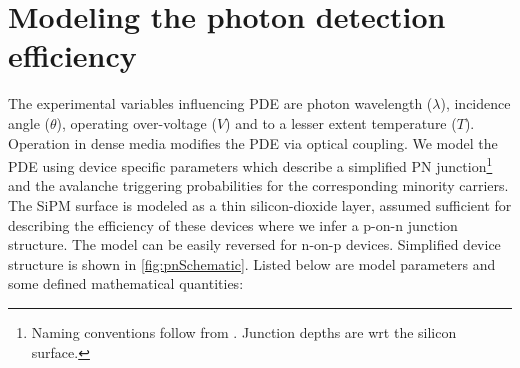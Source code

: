  
\section{Modeling the photon detection efficiency}

The experimental variables influencing PDE are photon wavelength ($\lambda$), incidence angle ($\theta$), operating over-voltage ($V$) and to a lesser extent temperature ($T$). Operation in dense media modifies the PDE via optical coupling. We model the PDE using device specific parameters which describe a simplified PN junction\footnote{Naming conventions follow from \cite{gallina_avalanche_2019}. Junction depths are wrt the silicon surface.} and the avalanche triggering probabilities for the corresponding minority carriers. The SiPM surface is modeled as a thin silicon-dioxide layer, assumed sufficient for describing the efficiency of these devices where we infer a p-on-n junction structure. The model can be easily reversed for n-on-p devices. Simplified device structure is shown in \autoref{fig:pnSchematic}. Listed below are model parameters and some defined mathematical quantities:


